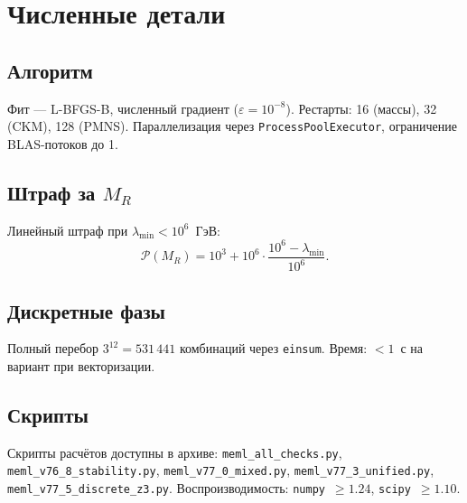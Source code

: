 \documentclass[11pt,a4paper]{article}
\numberwithin{equation}{section}
\begin{document}
\appendix

\section{Численные детали}

\subsection{Алгоритм}

Фит --- L-BFGS-B, численный градиент
($\varepsilon = 10^{-8}$). Рестарты: 16 (массы),
32 (CKM), 128 (PMNS). Параллелизация через
\texttt{ProcessPoolExecutor}, ограничение
BLAS-потоков до 1.

\subsection{Штраф за $M_R$}

Линейный штраф при $\lambda_{\min} < 10^6$~ГэВ:
\begin{equation}
\mathcal{P}(M_R) = 10^3 + 10^6 \cdot
\frac{10^6 - \lambda_{\min}}{10^6}.
\end{equation}

\subsection{Дискретные фазы}

Полный перебор $3^{12} = 531\,441$ комбинаций
через \texttt{einsum}. Время: $< 1$~с на вариант
при векторизации.

\subsection{Скрипты}

Скрипты расчётов доступны в архиве:
\texttt{meml\_all\_checks.py},
\texttt{meml\_v76\_8\_stability.py},
\texttt{meml\_v77\_0\_mixed.py},
\texttt{meml\_v77\_3\_unified.py},
\texttt{meml\_v77\_5\_discrete\_z3.py}.
Воспроизводимость: \texttt{numpy}~$\ge 1.24$,
\texttt{scipy}~$\ge 1.10$.
\end{document}
